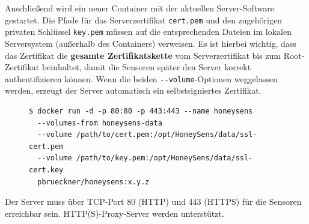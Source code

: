 \documentclass[12pt]{article}
\begin{document}
Anschließend wird ein neuer Container mit der aktuellen Server-Software gestartet. Die Pfade für das Serverzertifikat \verb|cert.pem| und den zugehörigen privaten Schlüssel \verb|key.pem| müssen auf die entsprechenden Dateien im lokalen Serversystem (außerhalb des Containers) verweisen. Es ist hierbei wichtig, dass das Zertifikat die \textbf{gesamte Zertifikatskette} vom Serverzertifikat bis zum Root-Zertifikat beinhaltet, damit die Sensoren später den Server korrekt authentifizieren können. Wenn die beiden \verb|--volume|-Optionen weggelassen werden, erzeugt der Server automatisch ein selbstsigniertes Zertifikat.
\begin{figure}[!h]
	\begin{lstlisting}
$ docker run -d -p 80:80 -p 443:443 --name honeysens
  --volumes-from honeysens-data 
  --volume /path/to/cert.pem:/opt/HoneySens/data/ssl-cert.pem
  --volume /path/to/key.pem:/opt/HoneySens/data/ssl-cert.key
  pbrueckner/honeysens:x.y.z
	\end{lstlisting}
\end{figure}

Der Server muss über TCP-Port 80 (HTTP) und 443 (HTTPS) für die Sensoren erreichbar sein. HTTP(S)-Proxy-Server werden unterstützt.
\end{document}
